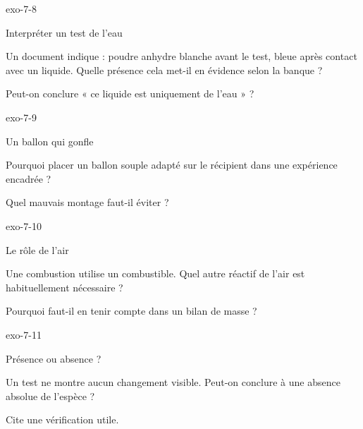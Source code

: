 \documentclass[12pt,twoside,openany]{book}
\begin{document}
\begin{blocLivre}{exo-7-8}
\begin{exercice}[2]{Interpréter un test de l’eau}
\begin{questions}
\item Un document indique : poudre anhydre blanche avant le test, bleue après contact avec un liquide. Quelle présence cela met-il en évidence selon la banque ?
\item Peut-on conclure « ce liquide est uniquement de l’eau » ?
\end{questions}
\end{exercice}\end{blocLivre}
\begin{blocLivre}{exo-7-9}
\begin{exercice}[2]{Un ballon qui gonfle}
\begin{questions}
\item Pourquoi placer un ballon souple adapté sur le récipient dans une expérience encadrée ?
\item Quel mauvais montage faut-il éviter ?
\end{questions}
\end{exercice}\end{blocLivre}
\begin{blocLivre}{exo-7-10}
\begin{exercice}[2]{Le rôle de l’air}
\begin{questions}
\item Une combustion utilise un combustible. Quel autre réactif de l’air est habituellement nécessaire ?
\item Pourquoi faut-il en tenir compte dans un bilan de masse ?
\end{questions}
\end{exercice}\end{blocLivre}
\begin{blocLivre}{exo-7-11}
\begin{exercice}[2]{Présence ou absence ?}
\begin{questions}
\item Un test ne montre aucun changement visible. Peut-on conclure à une absence absolue de l’espèce ?
\item Cite une vérification utile.
\end{questions}
\end{exercice}\end{blocLivre}
\end{document}
